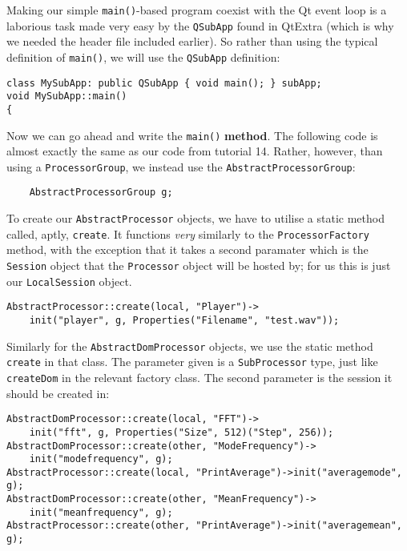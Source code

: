 Making our simple \texttt{main()}-based program coexist with the Qt event loop is a laborious task made very easy by the \texttt{QSubApp} found in QtExtra (which is why we needed the header file included earlier). So rather than using the typical definition of \texttt{main()}, we will use the \texttt{QSubApp} definition:

\begin{verbatim}
class MySubApp: public QSubApp { void main(); } subApp;
void MySubApp::main()
{
\end{verbatim}

Now we can go ahead and write the \texttt{main()} \textbf{method}. The following code is almost exactly the same as our code from tutorial 14. Rather, however, than using a \texttt{ProcessorGroup}, we instead use the \texttt{AbstractProcessorGroup}:

\begin{verbatim}
    AbstractProcessorGroup g;
\end{verbatim}

To create our \texttt{AbstractProcessor} objects, we have to utilise a static method called, aptly, \texttt{create}. It functions \textit{very} similarly to the \texttt{ProcessorFactory} method, with the exception that it takes a second paramater which is the \texttt{Session} object that the \texttt{Processor} object will be hosted by; for us this is just our \texttt{LocalSession} object.

\begin{verbatim}
AbstractProcessor::create(local, "Player")->
    init("player", g, Properties("Filename", "test.wav"));
\end{verbatim}

Similarly for the \texttt{AbstractDomProcessor} objects, we use the static method \texttt{create} in that class. The parameter given is a \texttt{SubProcessor} type, just like \texttt{createDom} in the relevant factory class. The second parameter is the session it should be created in:

\begin{verbatim}
AbstractDomProcessor::create(local, "FFT")->
    init("fft", g, Properties("Size", 512)("Step", 256));
AbstractDomProcessor::create(other, "ModeFrequency")->
    init("modefrequency", g);
AbstractProcessor::create(local, "PrintAverage")->init("averagemode", g);
AbstractDomProcessor::create(other, "MeanFrequency")->
    init("meanfrequency", g);
AbstractProcessor::create(other, "PrintAverage")->init("averagemean", g);
\end{verbatim}

